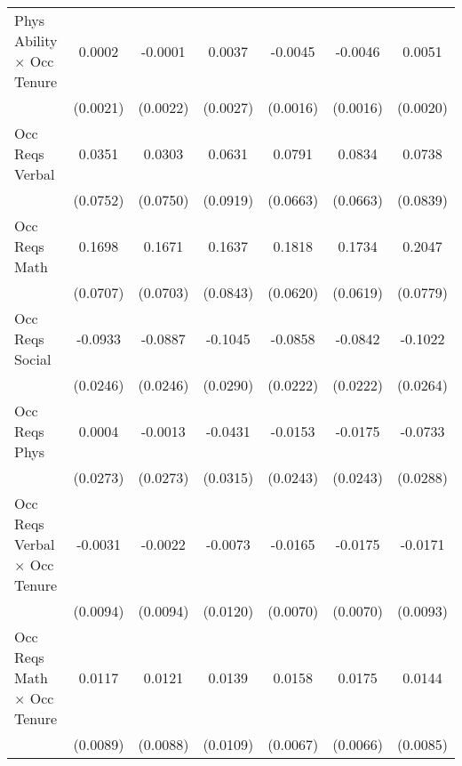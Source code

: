 {\begin{longtable}{l*{6}{c}}
Phys Ability $\times$ Occ Tenure&      0.0002         &     -0.0001         &      0.0037         &     -0.0045\sym{***}&     -0.0046\sym{***}&      0.0051\sym{**} \\
                    &    (0.0021)         &    (0.0022)         &    (0.0027)         &    (0.0016)         &    (0.0016)         &    (0.0020)         \\
Occ Reqs Verbal     &      0.0351         &      0.0303         &      0.0631         &      0.0791         &      0.0834         &      0.0738         \\
                    &    (0.0752)         &    (0.0750)         &    (0.0919)         &    (0.0663)         &    (0.0663)         &    (0.0839)         \\
Occ Reqs Math       &      0.1698\sym{**} &      0.1671\sym{**} &      0.1637\sym{*}  &      0.1818\sym{***}&      0.1734\sym{***}&      0.2047\sym{***}\\
                    &    (0.0707)         &    (0.0703)         &    (0.0843)         &    (0.0620)         &    (0.0619)         &    (0.0779)         \\
Occ Reqs Social     &     -0.0933\sym{***}&     -0.0887\sym{***}&     -0.1045\sym{***}&     -0.0858\sym{***}&     -0.0842\sym{***}&     -0.1022\sym{***}\\
                    &    (0.0246)         &    (0.0246)         &    (0.0290)         &    (0.0222)         &    (0.0222)         &    (0.0264)         \\
Occ Reqs Phys       &      0.0004         &     -0.0013         &     -0.0431         &     -0.0153         &     -0.0175         &     -0.0733\sym{**} \\
                    &    (0.0273)         &    (0.0273)         &    (0.0315)         &    (0.0243)         &    (0.0243)         &    (0.0288)         \\
Occ Reqs Verbal $\times$ Occ Tenure&     -0.0031         &     -0.0022         &     -0.0073         &     -0.0165\sym{**} &     -0.0175\sym{**} &     -0.0171\sym{*}  \\
                    &    (0.0094)         &    (0.0094)         &    (0.0120)         &    (0.0070)         &    (0.0070)         &    (0.0093)         \\
Occ Reqs Math $\times$ Occ Tenure&      0.0117         &      0.0121         &      0.0139         &      0.0158\sym{**} &      0.0175\sym{***}&      0.0144\sym{*}  \\
                    &    (0.0089)         &    (0.0088)         &    (0.0109)         &    (0.0067)         &    (0.0066)         &    (0.0085)         \\

\end{longtable}}
